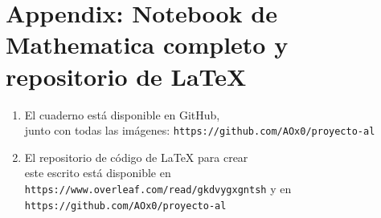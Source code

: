 \documentclass[a4paper]{article}
\begin{document}
\newpage
\section{Appendix: Notebook de Mathematica completo y repositorio de LaTeX}

\begin{enumerate}
\item El cuaderno está disponible en GitHub,\\ junto con todas las imágenes:
\texttt{https://github.com/AOx0/proyecto-al}
\item El repositorio de código de LaTeX para crear\\ este escrito está
disponible en\\  \texttt{https://www.overleaf.com/read/gkdvygxgntsh} y en
\texttt{https://github.com/AOx0/proyecto-al}
\end{enumerate}
\end{document}
